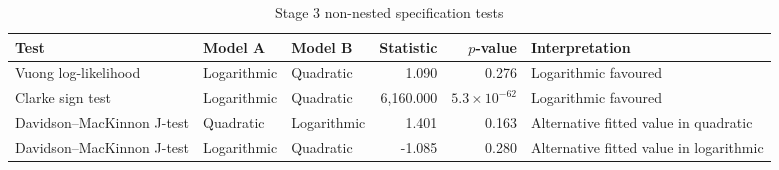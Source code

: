 \begin{table}[H]
\centering
\footnotesize
\setlength{\tabcolsep}{3pt}
\caption{Stage 3 non-nested specification tests}
\label{tab:app_stage3_specification_tests}
\begin{tabular}{@{}lllrrL{4.2cm}@{}}
\toprule
Test & Model A & Model B & Statistic & $p$-value & Interpretation \\
\midrule
Vuong log-likelihood & Logarithmic & Quadratic &     1.090 & 0.276 & Logarithmic favoured \\
Clarke sign test & Logarithmic & Quadratic & 6,160.000 & $5.3 \times 10^{-62}$ & Logarithmic favoured \\
Davidson–MacKinnon J-test & Quadratic & Logarithmic &     1.401 & 0.163 & Alternative fitted value in quadratic \\
Davidson–MacKinnon J-test & Logarithmic & Quadratic &    -1.085 & 0.280 & Alternative fitted value in logarithmic \\
\bottomrule
\end{tabular}
\end{table}
